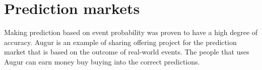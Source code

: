 \section{Prediction markets}
\label{sec:prediction}
Making prediction based on event probability was proven to have a high degree of accuracy. Augur is an example of sharing offering project for the prediction market that is based on the outcome of real-world events. The people that uses Augur can earn money buy buying into the correct predictions.

